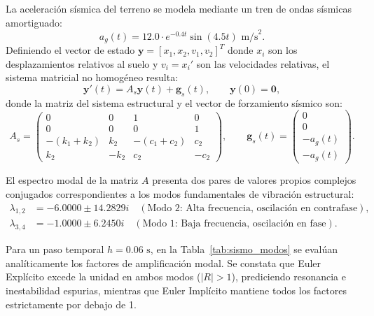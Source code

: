 \documentclass[11pt,a4paper]{article}
\begin{document}
La aceleración sísmica del terreno se modela mediante un tren de ondas sísmicas amortiguado:
\begin{equation}
    a_g(t) = 12.0 \cdot e^{-0.4 t} \sin(4.5 t)\text{ m/s}^2.
\end{equation}
Definiendo el vector de estado $\mathbf{y} = [x_1, x_2, v_1, v_2]^T$ donde $x_i$ son los desplazamientos relativos al suelo y $v_i = x_i'$ son las velocidades relativas, el sistema matricial no homogéneo resulta:
\begin{equation}
    \mathbf{y}'(t) = A_s \mathbf{y}(t) + \mathbf{g}_s(t), \qquad \mathbf{y}(0) = \mathbf{0},
    \label{eq:sismo_sistema}
\end{equation}
donde la matriz del sistema estructural y el vector de forzamiento sísmico son:
\begin{equation}
    A_s = \begin{pmatrix}
        0 & 0 & 1 & 0 \\
        0 & 0 & 0 & 1 \\
        -(k_1 + k_2) & k_2 & -(c_1 + c_2) & c_2 \\
        k_2 & -k_2 & c_2 & -c_2
    \end{pmatrix}, \qquad
    \mathbf{g}_s(t) = \begin{pmatrix} 0 \\ 0 \\ -a_g(t) \\ -a_g(t) \end{pmatrix}.
\end{equation}

El espectro modal de la matriz $A$ presenta dos pares de valores propios complejos conjugados correspondientes a los modos fundamentales de vibración estructural:
\begin{align}
    \lambda_{1,2} &= -6.0000 \pm 14.2829i \quad (\text{Modo 2: Alta frecuencia, oscilación en contrafase}), \\
    \lambda_{3,4} &= -1.0000 \pm 6.2450i \quad (\text{Modo 1: Baja frecuencia, oscilación en fase}).
\end{align}

Para un paso temporal $h = 0.06\text{ s}$, en la Tabla~\ref{tab:sismo_modos} se evalúan analíticamente los factores de amplificación modal. Se constata que Euler Explícito excede la unidad en ambos modos ($|R| > 1$), prediciendo resonancia e inestabilidad espurias, mientras que Euler Implícito mantiene todos los factores estrictamente por debajo de 1.
\end{document}
